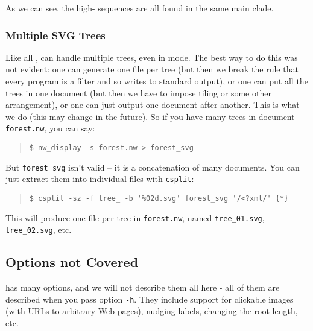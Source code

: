 \noindent{}As we can see, the high-\gc{} sequences are all found in the same
main clade.

\subsubsection{Multiple SVG Trees}

Like all \nutils, \display{} can handle multiple trees, even in \svg{} mode.
The best way to do this was not evident: one can generate one file per tree (but
then we break the rule that every program is a filter and so writes to standard
output), or one can put all the trees in one \svg{} document (but then we have
to impose tiling or some other arrangement), or one can just output one \svg{}
document after another. This is what we do (this may change in the future). So
if you have many trees in document \texttt{forest.nw}, you can say:
\begin{quote}
\verb+$ nw_display -s forest.nw > forest_svg+
\end{quote}
But \texttt{forest\_svg} isn't valid \svg{} -- it is a concatenation of many \svg{} documents. You can just extract them into individual files with \texttt{csplit}:
\begin{quote}
\verb+$ csplit -sz -f tree_ -b '%02d.svg' forest_svg '/<?xml/' {*}+
\end{quote}
This will produce one \svg{} file per tree in \texttt{forest.nw}, named \texttt{tree\_01.svg}, \texttt{tree\_02.svg}, etc.

\subsection{Options not Covered}

\display{} has many options, and we will not describe them all here - all of
them are described when you pass option \texttt{-h}. They include support for
clickable images (with URLs to arbitrary Web pages), nudging labels, changing
the root length, etc. 
